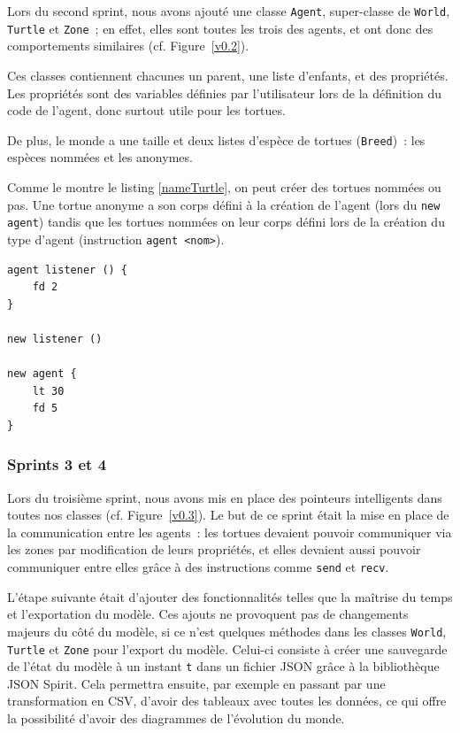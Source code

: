Lors du second sprint, nous avons ajouté une classe \verb|Agent|, super-classe de \verb|World|, \verb|Turtle| et \verb|Zone|~; en effet, elles sont toutes les trois des agents, et ont donc des comportements similaires (cf. Figure~\ref{v0.2}).

Ces classes contiennent chacunes un parent, une liste d'enfants, et des propriétés. Les propriétés sont des variables définies par l'utilisateur lors de la définition du code de l'agent, donc surtout utile pour les tortues.

De plus, le monde a une taille et deux listes d'espèce de tortues (\verb|Breed|)~: les espèces nommées et les anonymes.

Comme le montre le listing \ref{nameTurtle}, on peut créer des tortues nommées ou pas. Une tortue anonyme a son corps défini à la création de l'agent (lors du \verb|new agent|) tandis que les tortues nommées on leur corps défini lors de la création du type d'agent (instruction \verb|agent <nom>|).

\begin{lstlisting}[language=Stibbons,label=nameTurtle,caption=Nommage lors de la création d'une tortue]
agent listener () {
	fd 2
}

new listener ()

new agent {
	lt 30
	fd 5
}
\end{lstlisting}

\subsubsection{Sprints 3 et 4}
Lors du troisième sprint, nous avons mis en place des pointeurs intelligents dans toutes nos classes (cf. Figure~\ref{v0.3}). Le but de ce sprint était la mise en place de la communication entre les agents~: les tortues devaient pouvoir communiquer via les zones par modification de leurs propriétés, et elles devaient aussi pouvoir communiquer entre elles grâce à des instructions comme \verb|send| et \verb|recv|.

L'étape suivante était d'ajouter des fonctionnalités telles que la maîtrise du temps et l'exportation du modèle. Ces ajouts ne provoquent pas de changements majeurs du côté du modèle, si ce n'est quelques méthodes dans les classes \verb|World|, \verb|Turtle| et \verb|Zone| pour l'export du modèle.
Celui-ci consiste à créer une sauvegarde de l'état du modèle à un instant \verb|t| dans un fichier JSON grâce à la bibliothèque JSON Spirit.
Cela permettra ensuite, par exemple en passant par une transformation en CSV, d'avoir des tableaux avec toutes les données, ce qui offre la possibilité d'avoir des diagrammes de l'évolution du monde.

